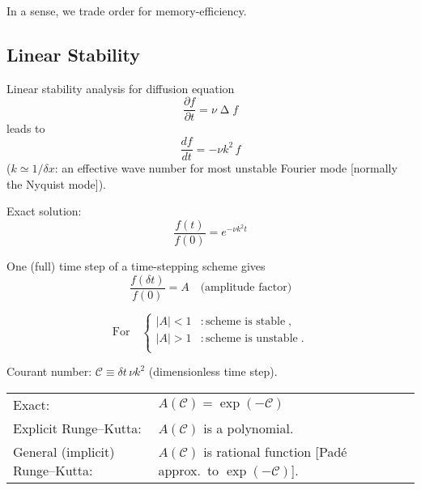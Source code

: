 \documentclass[\mydriver,12pt,twoside,notitlepage]{article}
\newcommand{\Black}{\color{black}}
\newcommand{\Courant} {\mathcal{C}}
\newcommand{\Laplace} { \mathop{\Delta}\nolimits}
\begin{document}
\bigskip

In a sense, we trade order for memory-efficiency.

\subsection{Linear Stability}

Linear stability analysis for diffusion equation
\begin{equation}
  \dfrac{\partial f}{\partial t}
  = \nu \Laplace f
\end{equation}
leads to
\begin{equation}
  \dfrac{df}{dt} = - \nu k^2 \,f
\end{equation}
($k \simeq 1/\delta x$: an effective wave number for most
unstable Fourier mode [normally the Nyquist mode]).

Exact solution:
\begin{equation}
  \dfrac{f(t)}{f(0)} = e^{-\nu k^2 t}
\end{equation}

One (full) time step of a time-stepping scheme gives
\begin{equation}
  \dfrac{f(\delta t)}{f(0)} = A
  \quad\text{(amplitude factor)}
\end{equation}

\begin{equation*}
  \text{For} \quad
  \begin{cases}
    |A| < 1 &: \text{scheme is stable} \; , \\
    |A| > 1 &: \text{scheme is unstable} \; . \\
  \end{cases}
\end{equation*}

\clearpage

Courant number: $\Courant \equiv \delta t \, \nu k^2$ (dimensionless time step). 

\bigskip

\begin{tabular}{@{}ll}
  \Black
  Exact:                           & $A(\Courant) = \exp(-\Courant)$\\[1.5ex]
  \Black
  Explicit Runge--Kutta:           &  $A(\Courant)$ is a polynomial.\\[1.5ex]
  \Black
  General (implicit) Runge--Kutta: & $A(\Courant)$ is rational function
                                     [Padé approx.\ to $\exp(-\Courant)$].
\end{tabular}
\end{document}
